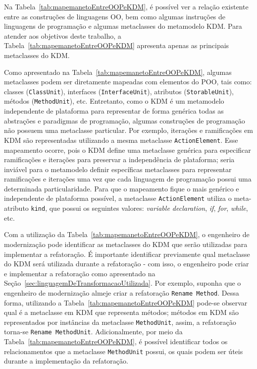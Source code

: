 
Na Tabela~\ref{tab:mapemanetoEntreOOPeKDM}, é possível ver a relação existente entre as construções de linguagens OO, bem como algumas instruções de linguagens de programação e algumas metaclasses do metamodelo KDM. Para atender aos objetivos deste trabalho, a Tabela~\ref{tab:mapemanetoEntreOOPeKDM} apresenta apenas as principais metaclasses do KDM.%

Como apresentado na Tabela~\ref{tab:mapemanetoEntreOOPeKDM}, algumas metaclasses podem ser diretamente mapeadas com elementos do POO, tais como: classes (\texttt{ClassUnit}), interfaces (\texttt{InterfaceUnit}), atributos (\texttt{StorableUnit}), métodos (\texttt{MethodUnit}), etc. Entretanto, como o KDM é um metamodelo independente de plataforma para representar de forma genérica todas as abstrações e paradigmas de programação, algumas construções de programação não possuem uma metaclasse particular. Por exemplo, iterações e ramificações em KDM são representadas utilizando a mesma metaclasse \texttt{ActionElement}. Esse mapeamento ocorre, pois o KDM define uma metaclasse genérica para especificar ramificações e iterações para preservar a independência de plataforma; seria inviável para o metamodelo definir específicas metaclasses para representar ramificações e iterações uma vez que cada linguagem de programação possui uma determinada particularidade. Para que o mapeamento fique o mais genérico e independente de plataforma possível, a metaclasse \texttt{ActionElement} utiliza o meta-atributo \texttt{kind}, que possui os seguintes valores: \textit{variable declaration}, \textit{if}, \textit{for}, \textit{while}, etc.

Com a utilização da Tabela~\ref{tab:mapemanetoEntreOOPeKDM}, o engenheiro de modernização pode identificar as metaclasses do KDM que serão utilizadas para implementar a refatoração. É importante identificar previamente qual metaclasse do KDM será utilizada durante a refatoração - com isso, o engenheiro pode criar e implementar a refatoração como apresentado na Seção~\ref{sec:linguagemDeTransformacaoUtilizada}. Por exemplo, suponha que o engenheiro de modernização almeje criar a refatoração \texttt{Rename Method}. Dessa forma, utilizando a Tabela~\ref{tab:mapemanetoEntreOOPeKDM} pode-se observar qual é a metaclasse em KDM que representa métodos; métodos em KDM são representados por instâncias da metaclasse \texttt{MethodUnit}, assim, a refatoração torna-se \texttt{Rename MethodUnit}. Adicionalmente, por meio da Tabela~\ref{tab:mapemanetoEntreOOPeKDM}, é possível identificar todos os relacionamentos que a metaclasse \texttt{MethodUnit} possui, os quais podem ser úteis durante a implementação da refatoração.


